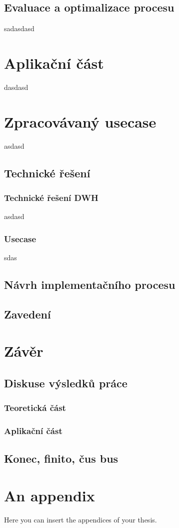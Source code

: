 \documentclass[
  digital,     %
  twoside,     %
  lof,         %
  lot,         %
]{fithesis4}
\begin{document}
\section{Evaluace a optimalizace procesu}
sadasdasd

\chapter{Aplikační část}
dasdasd

\chapter{Zpracovávaný usecase}
asdasd

\section{Technické řešení}
\subsection{Technické řešení DWH}
asdasd
\subsection{Usecase}
sdas

\section{Návrh implementačního procesu}
\section{Zavedení}

\chapter{Závěr}
\section{Diskuse výsledků práce}
\subsection{Teoretická část}
\subsection{Aplikační část}
\section{Konec, finito, čus bus}

\printbibliography[heading=bibintoc] %

  \makeatletter\thesis@blocks@clear\makeatother
  \printindex

\appendix %
\chapter{An appendix}
Here you can insert the appendices of your thesis.
\end{document}
